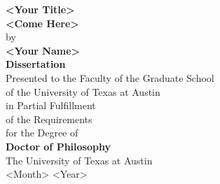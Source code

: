 \vspace*{2em}
\begin{center}
    {\large\textbf{<Your Title>}}\\[0.2em]
    {\large\textbf{<Come Here>}}
\\[2.5em]
by\\[2.5em]
\textbf{<Your Name>}\\[2.5em]
\textbf{Dissertation}\\[2.5em]
Presented to the Faculty of the Graduate School\\
of the University of Texas at Austin\\
in Partial Fulfillment\\
of the Requirements\\
for the Degree of\\[2.5em]
\textbf{Doctor of Philosophy}\\[2.5em]
The University of Texas at Austin\\
<Month> <Year>
\end{center}
\thispagestyle{empty}
\newpage
